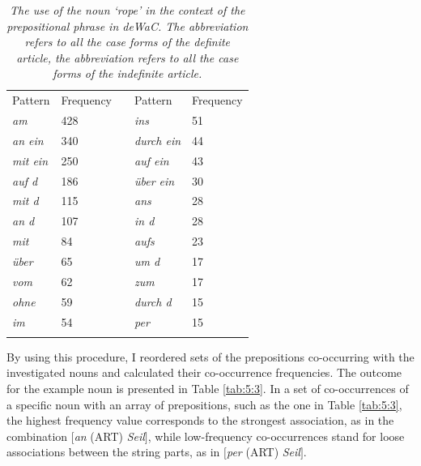 \begin{table}[]
		\begin{tabularx}{\textwidth}{L{2cm}R{2cm}XL{2cm}R{2cm}}
		\midrule
		\addlinespace[2mm]
		Pattern & Frequency & & Pattern & Frequency\\
		\addlinespace[2mm] 
		\midrule
		\addlinespace[2mm]
			\textit{am} & 428 && \textit{ins} & 51\\
			\textit{an ein} & 340 && \textit{durch ein} & 44\\
			\textit{mit ein} & 250 && \textit{auf ein} & 43\\
			\textit{auf d} & 186 && \textit{über ein} & 30\\
			\textit{mit d} & 115 && \textit{ans} & 28\\
			\textit{an d} & 107 && \textit{in d} & 28\\
			\textit{mit} & 84 && \textit{aufs} & 23\\
			\textit{über} & 65 && \textit{um d} & 17\\
			\textit{vom} & 62 && \textit{zum} & 17\\
			\textit{ohne} & 59 && \textit{durch d} & 15\\
			\textit{im} & 54 && \textit{per} & 15\\
		\addlinespace[2mm]
		\midrule
	\end{tabularx}
	\caption{\itshape The use of the noun  \itshape `rope' in the context of the prepositional phrase in deWaC. The abbreviation  \itshape refers to all the case forms of the definite article, the abbreviation  \itshape refers to all the case forms of the indefinite article.}\label{tab:5:2}
\end{table}

By using this procedure, I reordered sets of the prepositions co-occurring with the investigated nouns and calculated their co-occurrence frequencies. The outcome for the example noun is presented in Table \ref{tab:5:3}. In a set of co-occurrences of a specific noun with an array of prepositions, such as the one in Table \ref{tab:5:3}, the highest frequency value corresponds to the strongest association, as in the combination \([\)\textit{an} (ART) \textit{Seil}\(]\), while low-frequency co-occurrences stand for loose associations between the string parts, as in \([\)\textit{per} (ART) \textit{Seil}\(]\).

